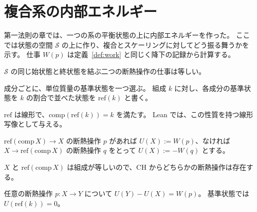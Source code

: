 \section{複合系の内部エネルギー}

第一法則の章では、一つの系の平衡状態の上に内部エネルギーを作った。
ここでは状態の空間 $\mathcal{S}$ の上に作り、複合とスケーリングに対してどう振る舞うかを示す。
仕事 $W(p)$ は定義~\ref{def:work} と同じく降下の記録から計算する。

\begin{empirical}[複合系の経路独立性]
  \label{emp:path-indep-composite}
  \leanok
  $\mathcal{S}$ の同じ始状態と終状態を結ぶ二つの断熱操作の仕事は等しい。
\end{empirical}

\begin{definition}[組成ごとの基準状態]
  \label{def:ref}
  \leanok
  成分ごとに、単位質量の基準状態を一つ選ぶ。
  組成 $k$ に対し、各成分の基準状態を $k$ の割合で並べた状態を $\mathrm{ref}(k)$ と書く。
\end{definition}

$\mathrm{ref}$ は線形で、$\mathrm{comp}(\mathrm{ref}(k)) = k$ を満たす。
Lean では、この性質を持つ線形写像として与える。

\begin{definition}[複合系の内部エネルギー]
  \label{def:energy-composite}
  \leanok
  $\mathrm{ref}(\mathrm{comp}\, X) \to X$ の断熱操作 $p$ があれば $U(X) := W(p)$、なければ $X \to \mathrm{ref}(\mathrm{comp}\, X)$ の断熱操作 $q$ をとって $U(X) := -W(q)$ とする。
\end{definition}

$X$ と $\mathrm{ref}(\mathrm{comp}\, X)$ は組成が等しいので、CH からどちらかの断熱操作は存在する。

\begin{theorem}[複合系の内部エネルギーの存在]
  \label{thm:energy-composite}
  \leanok
  任意の断熱操作 $p : X \to Y$ について $U(Y) - U(X) = W(p)$。
  基準状態では $U(\mathrm{ref}(k)) = 0$。
\end{theorem}

